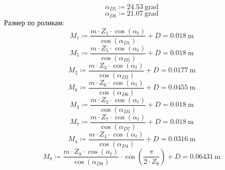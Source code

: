 \documentclass{article}
\newcommand{\defeq}{\coloneq} %
\begin{document}
\begin{equation*}
\textit{α}_{\textit{D5}} \defeq 24.53 \: \mathrm{grad}
\end{equation*}
\begin{equation*}
\textit{α}_{\textit{D8}} \defeq 21.07 \: \mathrm{grad}
\end{equation*}
\colorbox[HTML]{000000}{Размер по роликам:}\newline
\begin{equation*}
\textit{M}_{\textit{1}} \defeq \frac{m \cdot \textit{Z}_{\textit{1}} \cdot \cos \left( α_{t} \right)}{\cos \left( \textit{α}_{\textit{D1}} \right)}+D = {0.018 \: \mathrm{m}}
\end{equation*}
\begin{equation*}
\textit{M}_{\textit{5}} \defeq \frac{m \cdot \textit{Z}_{\textit{5}} \cdot \cos \left( α_{t} \right)}{\cos \left( \textit{α}_{\textit{D5}} \right)}+D = {0.018 \: \mathrm{m}}
\end{equation*}
\begin{equation*}
\textit{M}_{\textit{2}} \defeq \frac{m \cdot \textit{Z}_{\textit{3}} \cdot \cos \left( α_{t} \right)}{\cos \left( \textit{α}_{\textit{D2}} \right)}+D = {0.0177 \: \mathrm{m}}
\end{equation*}
\begin{equation*}
\textit{M}_{\textit{6}} \defeq \frac{m \cdot \textit{Z}_{\textit{6}} \cdot \cos \left( α_{t} \right)}{\cos \left( \textit{α}_{\textit{D6}} \right)}+D = {0.0455 \: \mathrm{m}}
\end{equation*}
\begin{equation*}
\textit{M}_{\textit{3}} \defeq \frac{m \cdot \textit{Z}_{\textit{3}} \cdot \cos \left( α_{t} \right)}{\cos \left( \textit{α}_{\textit{D3}} \right)}+D = {0.018 \: \mathrm{m}}
\end{equation*}
\begin{equation*}
\textit{M}_{\textit{7}} \defeq \frac{m \cdot \textit{Z}_{\textit{7}} \cdot \cos \left( α_{t} \right)}{\cos \left( \textit{α}_{\textit{D7}} \right)}+D = {0.018 \: \mathrm{m}}
\end{equation*}
\begin{equation*}
\textit{M}_{\textit{4}} \defeq \frac{m \cdot \textit{Z}_{\textit{4}} \cdot \cos \left( α_{t} \right)}{\cos \left( \textit{α}_{\textit{D4}} \right)}+D = {0.0316 \: \mathrm{m}}
\end{equation*}
\begin{equation*}
\textit{M}_{\textit{8}} \defeq \frac{m \cdot \textit{Z}_{\textit{8}} \cdot \cos \left( α_{t} \right)}{\cos \left( \textit{α}_{\textit{D8}} \right)} \cdot \cos \left( \frac{{\pi}}{2 \cdot \textit{Z}_{\textit{8}}} \right)+D = {0.06431 \: \mathrm{m}}
\end{equation*}
\end{document}
